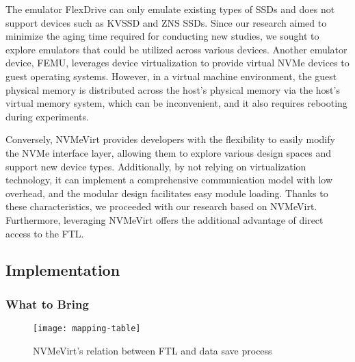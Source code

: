 The emulator FlexDrive can only emulate existing types of SSDs and does not support devices such as KVSSD and ZNS SSDs.
Since our research aimed to minimize the aging time required for conducting new studies, we sought to explore emulators that could be utilized across various devices.
Another emulator device, FEMU, leverages device virtualization to provide virtual NVMe devices to guest operating systems.
However, in a virtual machine environment, the guest physical memory is distributed across the host's physical memory via the host's virtual memory system, which can be inconvenient, and it also requires rebooting during experiments.



Conversely, NVMeVirt provides developers with the flexibility to easily modify the NVMe interface layer, allowing them to explore various design spaces and support new device types.
Additionally, by not relying on virtualization technology, it can implement a comprehensive communication model with low overhead, and the modular design facilitates easy module loading.
Thanks to these characteristics, we proceeded with our research based on NVMeVirt.
Furthermore, leveraging NVMeVirt offers the additional advantage of direct access to the FTL.

\subsection{Implementation}

\subsubsection{What to Bring}

\begin{figure*}[t]
    \centering
    \texttt{[image: mapping-table]}
    \caption{NVMeVirt’s relation between FTL and data save process}
    \label{fig:mappingtable}
\end{figure*}


